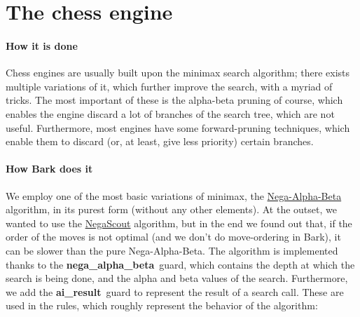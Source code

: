 \documentclass[a4paper, 10pt]{scrartcl}
\newcommand{\noderepr}[1]{\textsf{\textbf{#1}}}
\newcommand{\ai}{\noderepr{nega\_alpha\_beta}}
\newcommand{\airesult}{\noderepr{ai\_result}}
\begin{document}
    \section{The chess engine}
    \paragraph*{How it is done} Chess engines are usually built upon the minimax search algorithm; there exists multiple variations of it, which further improve the search, with a myriad of tricks. The most important of these is the alpha-beta pruning of course, which enables the engine discard a lot of branches of the search tree, which are not useful. Furthermore, most engines have some forward-pruning techniques, which enable them to discard (or, at least, give less priority) certain branches.
    \paragraph*{How Bark does it} We employ one of the most basic variations of minimax, the \href{https://www.chessprogramming.org/Alpha-Beta}{Nega-Alpha-Beta} algorithm, in its purest form (without any other elements). At the outset, we wanted to use the \href{https://www.chessprogramming.org/NegaScout}{NegaScout} algorithm, but in the end we found out that, if the order of the moves is not optimal (and we don't do move-ordering in Bark), it can be slower than the pure Nega-Alpha-Beta. The algorithm is implemented thanks to the \ai\ guard, which contains the depth at which the search is being done, and the alpha and beta values of the search. Furthermore, we add the \airesult\ guard to represent the result of a search call. These are used in the rules, which roughly represent the behavior of the algorithm:
\end{document}
